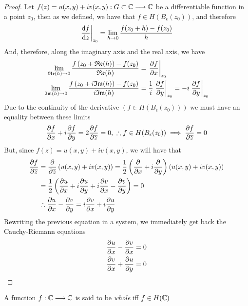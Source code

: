 \documentclass[../complete.tex]{subfiles}
\begin{document}
\begin{proof}
	Let $f(z)=u(x,y)+iv(x,y):G\subset\Cf\fto\Cf$ be a differentiable function in a point $z_0$, then as we defined, we have that $f\in H(B_\epsilon(z_0))$, and therefore
	\begin{equation*}
		\derin[z_0]{\derivative{f}{z}}=\lim_{h\to0}\frac{f(z_0+h)-f(z_0)}{h}
	\end{equation*}
	And, therefore, along the imaginary axis and the real axis, we have
	\begin{equation*}
		\begin{aligned}
			\lim_{\real(h)\to0}\frac{f\left( z_0+\real(h) \right)-f(z_0)}{\real(h)}&=\derin[z_0]{\pdv{f}{x}}\\
			\lim_{\imaginary(h)\to0}\frac{f\left( z_0+i\imaginary(h) \right)-f(z_0)}{i\imaginary(h)}&=\frac{1}{i}\derin[z_0]{\pdv{f}{y}}=-i\derin[z_0]{\pdv{f}{y}}
		\end{aligned}
	\end{equation*}
	Due to the continuity of the derivative $\left( f\in H(B_\epsilon(z_0)) \right)$ we must have an equality between these limits
	\begin{equation*}
		\pdv{f}{x}+i\pdv{f}{y}=2\pdv{f}{\cc{z}}=0,\ \therefore f\in H(B_\epsilon(z_0))\implies\pdv{f}{\cc{z}}=0
	\end{equation*}
	But, since $f(z)=u(x,y)+iv(x,y)$, we will have that
	\begin{equation*}
		\begin{aligned}
			\pdv{f}{\cc{z}}&=\pdv{\cc{z}}\left( u(x,y)+iv(x,y) \right)=\frac{1}{2}\left( \pdv{x}+i\pdv{y} \right)\left( u(x,y)+iv(x,y) \right)\\
			&=\frac{1}{2}\left( \pdv{u}{x}+i\pdv{u}{y}+i\pdv{v}{x}-\pdv{v}{y} \right)=0\\
			&\therefore\pdv{u}{x}-\pdv{v}{y}=i\pdv{v}{x}+i\pdv{u}{y}
		\end{aligned}
	\end{equation*}
	Rewriting the previous equation in a system, we immediately get back the Cauchy-Riemann equations
	\begin{equation*}
		\begin{aligned}
			\pdv{u}{x}-\pdv{v}{x}&=0\\
			\pdv{v}{x}+\pdv{u}{y}&=0
		\end{aligned}
	\end{equation*}
\end{proof}
\begin{dfn}
	A function $f:\Cf\fto\Cf$ is said to be \textit{whole} iff $f\in H(\Cf)$
\end{dfn}
\end{document}
